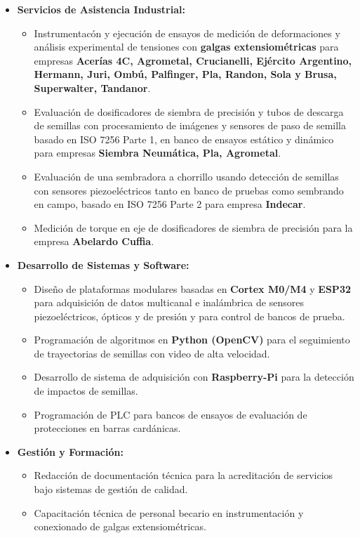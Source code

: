 \documentclass[11pt,a4paper]{article}
\begin{document}
\begin{itemize}[leftmargin=0.5cm, topsep=4pt]
    \item \textbf{Servicios de Asistencia Industrial:}
        \begin{itemize}[label=$\circ$]
            \item Instrumentacón y ejecución de ensayos de medición de deformaciones y análisis experimental de tensiones con \textbf{galgas extensiométricas} para empresas \textbf{Acerías 4C, Agrometal, Crucianelli, Ejército Argentino, Hermann, Juri, Ombú, Palfinger, Pla, Randon, Sola y Brusa, Superwalter, Tandanor}.
            \item Evaluación de dosificadores de siembra de precisión y tubos de descarga de semillas con procesamiento de imágenes y sensores de paso de semilla basado en ISO 7256 Parte 1, en banco de ensayos estático y dinámico para empresas \textbf{Siembra Neumática, Pla, Agrometal}.
            \item Evaluación de una sembradora a chorrillo usando detección de semillas con sensores piezoeléctricos tanto en banco de pruebas como sembrando en campo, basado en ISO 7256 Parte 2 para empresa \textbf{Indecar}.
            \item Medición de torque en eje de dosificadores de siembra de precisión para la empresa \textbf{Abelardo Cuffia}.
        \end{itemize}

    \item \textbf{Desarrollo de Sistemas y Software:} 
        \begin{itemize}[label=$\circ$]
            \item Diseño de plataformas modulares basadas en \textbf{Cortex M0/M4} y \textbf{ESP32} para adquisición de datos multicanal e inalámbrica de sensores piezoeléctricos, ópticos y de presión y para control de bancos de prueba.
            \item Programación de algoritmos en \textbf{Python (OpenCV)} para el seguimiento de trayectorias de semillas con video de alta velocidad.
            \item Desarrollo de sistema de adquisición con \textbf{Raspberry-Pi} para la detección de impactos de semillas.
            \item Programación de PLC para bancos de ensayos de evaluación de protecciones en barras cardánicas.
        \end{itemize}

    \item \textbf{Gestión y Formación:}
        \begin{itemize}[label=$\circ$]
            \item Redacción de documentación técnica para la acreditación de servicios bajo sistemas de gestión de calidad.
            \item Capacitación técnica de personal becario en instrumentación y conexionado de galgas extensiométricas.
        \end{itemize}
\end{itemize}
\end{document}

